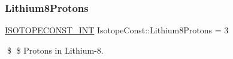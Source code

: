 \subsubsection{\texorpdfstring{Lithium8\+Protons}{Lithium8Protons}}
{\footnotesize\ttfamily \mbox{\hyperlink{group___isotope_const-_macros_ga5f18360b3e99483a35c32d789e62621c}{I\+S\+O\+T\+O\+P\+E\+C\+O\+N\+S\+T\+\_\+\+I\+NT}} Isotope\+Const\+::\+Lithium8\+Protons = 3}

\$ \$ Protons in Lithium-\/8. 
